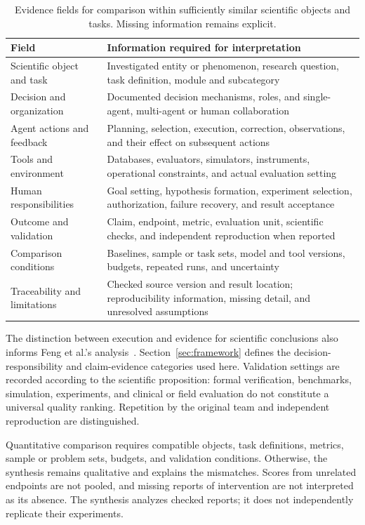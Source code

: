 \begin{table}[t]
\caption{Evidence fields for comparison within sufficiently similar scientific objects and tasks. Missing information remains explicit.}
\label{tab:extraction}
\small
\begin{tabularx}{\textwidth}{@{}p{}X@{}}
\toprule
Field & Information required for interpretation \\
\midrule
Scientific object and task & Investigated entity or phenomenon, research question, task definition, module and subcategory \\
Decision and organization & Documented decision mechanisms, roles, and single-agent, multi-agent or human collaboration \\
Agent actions and feedback & Planning, selection, execution, correction, observations, and their effect on subsequent actions \\
Tools and environment & Databases, evaluators, simulators, instruments, operational constraints, and actual evaluation setting \\
Human responsibilities & Goal setting, hypothesis formation, experiment selection, authorization, failure recovery, and result acceptance \\
Outcome and validation & Claim, endpoint, metric, evaluation unit, scientific checks, and independent reproduction when reported \\
Comparison conditions & Baselines, sample or task sets, model and tool versions, budgets, repeated runs, and uncertainty \\
Traceability and limitations & Checked source version and result location; reproducibility information, missing detail, and unresolved assumptions \\
\bottomrule
\end{tabularx}
\end{table}

The distinction between execution and evidence for scientific conclusions also informs Feng et al.'s analysis~\cite{feng2026}. Section~\ref{sec:framework} defines the decision-responsibility and claim-evidence categories used here. Validation settings are recorded according to the scientific proposition: formal verification, benchmarks, simulation, experiments, and clinical or field evaluation do not constitute a universal quality ranking. Repetition by the original team and independent reproduction are distinguished.

Quantitative comparison requires compatible objects, task definitions, metrics, sample or problem sets, budgets, and validation conditions. Otherwise, the synthesis remains qualitative and explains the mismatches. Scores from unrelated endpoints are not pooled, and missing reports of intervention are not interpreted as its absence. The synthesis analyzes checked reports; it does not independently replicate their experiments.

